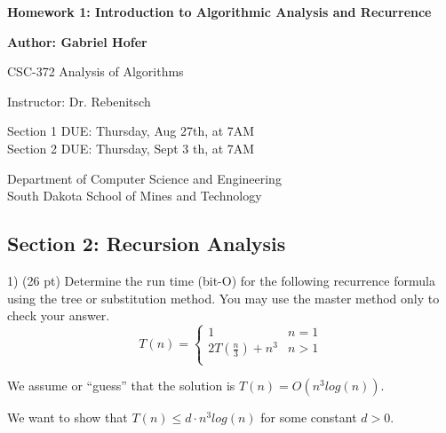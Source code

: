 \documentclass[8pt, a4paper]{article}
\begin{document}
\begin{titlepage}
   \begin{center}
       \vspace*{1cm}
       \large
       \textbf{Homework 1: Introduction to Algorithmic Analysis and Recurrence}
       \normalsize

       \vspace{0.5cm}

       \textbf{Author: Gabriel Hofer}

       \vspace{0.5cm}

       CSC-372 Analysis of Algorithms

       \vspace{0.5cm}

       Instructor: Dr. Rebenitsch

       \vspace{0.5cm}

       Section 1 DUE: Thursday, Aug 27th, at 7AM \\ 
       Section 2 DUE: Thursday, Sept 3 th, at 7AM  

       \vfill

       Department of Computer Science and Engineering\\
       South Dakota School of Mines and Technology\\

   \end{center}
\end{titlepage}
\newpage
\subsection*{Section 2: Recursion Analysis}

1) (26 pt) Determine the run time (bit-O) for the following recurrence formula using the tree or substitution method.
You may use the master method only to check your answer. \\ 

\[
  T(n) =  
  \begin{cases}
    1 & n = 1  \\
    2T(\frac{n}{3}) + n^3 & n > 1  \\
  \end{cases}
\]

We assume or ``guess'' that the solution is $ T(n) = O(n^3 log(n)) $.

We want to show that $ T(n) \leq d \cdot n^3 log(n) $ for some constant $ d > 0 $.
\end{document}

